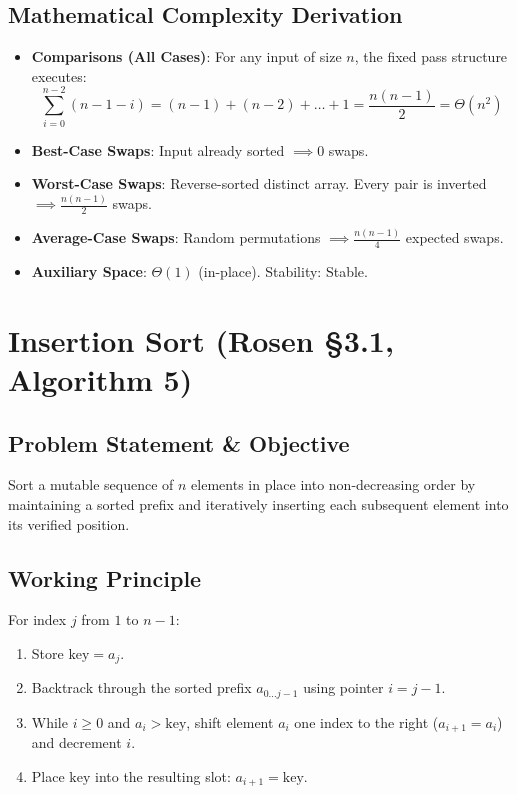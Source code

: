 \documentclass[11pt,a4paper,oneside]{report}
\theoremstyle{definition}
\begin{document}
\subsection{Mathematical Complexity Derivation}
\begin{itemize}
    \item \textbf{Comparisons (All Cases)}: For any input of size $n$, the fixed pass structure executes:
    $$\sum_{i=0}^{n-2} (n - 1 - i) = (n - 1) + (n - 2) + \dots + 1 = \frac{n(n - 1)}{2} = \Theta(n^2)$$
    \item \textbf{Best-Case Swaps}: Input already sorted $\implies 0$ swaps.
    \item \textbf{Worst-Case Swaps}: Reverse-sorted distinct array. Every pair is inverted $\implies \frac{n(n-1)}{2}$ swaps.
    \item \textbf{Average-Case Swaps}: Random permutations $\implies \frac{n(n-1)}{4}$ expected swaps.
    \item \textbf{Auxiliary Space}: $\Theta(1)$ (in-place). Stability: Stable.
\end{itemize}

\section{Insertion Sort (Rosen §3.1, Algorithm 5)}
\label{sec:insertion_sort}

\subsection{Problem Statement \& Objective}
Sort a mutable sequence of $n$ elements in place into non-decreasing order by maintaining a sorted prefix and iteratively inserting each subsequent element into its verified position.

\subsection{Working Principle}
For index $j$ from $1$ to $n-1$:
\begin{enumerate}
    \item Store $\text{key} = a_j$.
    \item Backtrack through the sorted prefix $a_{0 \dots j-1}$ using pointer $i = j - 1$.
    \item While $i \ge 0$ and $a_i > \text{key}$, shift element $a_i$ one index to the right ($a_{i+1} = a_i$) and decrement $i$.
    \item Place $\text{key}$ into the resulting slot: $a_{i+1} = \text{key}$.
\end{enumerate}
\end{document}
